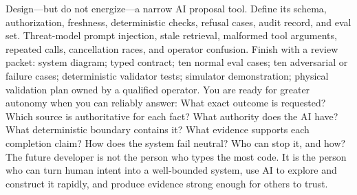 {}Design—but do not energize—a narrow AI proposal tool. Define its schema,\markdownRendererSoftLineBreak
{}authorization, freshness, deterministic checks, refusal cases, audit record,\markdownRendererSoftLineBreak
{}and eval set. Threat-model prompt injection, stale retrieval, malformed tool\markdownRendererSoftLineBreak
{}arguments, repeated calls, cancellation races, and operator confusion.\markdownRendererParagraphSeparator
{}Finish with a review packet:\markdownRendererInterblockSeparator
{}\markdownRendererUlBegin
\markdownRendererUlItem system diagram;\markdownRendererUlItemEnd 
\markdownRendererUlItem typed contract;\markdownRendererUlItemEnd 
\markdownRendererUlItem ten normal eval cases;\markdownRendererUlItemEnd 
\markdownRendererUlItem ten adversarial or failure cases;\markdownRendererUlItemEnd 
\markdownRendererUlItem deterministic validator tests;\markdownRendererUlItemEnd 
\markdownRendererUlItem simulator demonstration;\markdownRendererUlItemEnd 
\markdownRendererUlItem physical validation plan owned by a qualified operator.\markdownRendererUlItemEnd 
\markdownRendererUlEnd \markdownRendererInterblockSeparator
{}
\markdownRendererSectionEnd \markdownRendererSectionBegin
{}\markdownRendererInterblockSeparator
{}You are ready for greater autonomy when you can reliably answer:\markdownRendererInterblockSeparator
{}\markdownRendererOlBegin
{}What exact outcome is requested?\markdownRendererOlItemEnd 
{}Which source is authoritative for each fact?\markdownRendererOlItemEnd 
{}What authority does the AI have?\markdownRendererOlItemEnd 
{}What deterministic boundary contains it?\markdownRendererOlItemEnd 
{}What evidence supports each completion claim?\markdownRendererOlItemEnd 
{}How does the system fail neutral?\markdownRendererOlItemEnd 
{}Who can stop it, and how?\markdownRendererOlItemEnd 
\markdownRendererOlEnd \markdownRendererInterblockSeparator
{}The future developer is not the person who types the most code. It is the\markdownRendererSoftLineBreak
{}person who can turn human intent into a well-bounded system, use AI to explore\markdownRendererSoftLineBreak
{}and construct it rapidly, and produce evidence strong enough for others to\markdownRendererSoftLineBreak
{}trust.\markdownRendererInterblockSeparator
{}\markdownRendererThematicBreak{}\markdownRendererInterblockSeparator
